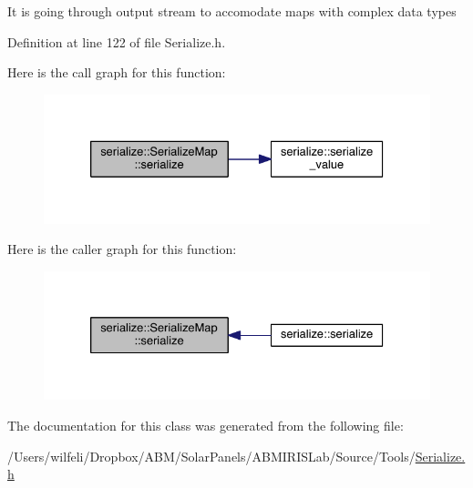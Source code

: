 It is going through output stream to accomodate maps with complex data types 

Definition at line 122 of file Serialize.\+h.



Here is the call graph for this function\+:
\nopagebreak
\begin{figure}[H]
\begin{center}
\leavevmode
\includegraphics[width=330pt]{classserialize_1_1_serialize_map_a5c22ada5923b1d8b547cec4950dd357c_cgraph}
\end{center}
\end{figure}




Here is the caller graph for this function\+:
\nopagebreak
\begin{figure}[H]
\begin{center}
\leavevmode
\includegraphics[width=330pt]{classserialize_1_1_serialize_map_a5c22ada5923b1d8b547cec4950dd357c_icgraph}
\end{center}
\end{figure}




The documentation for this class was generated from the following file\+:\begin{DoxyCompactItemize}
\item 
/\+Users/wilfeli/\+Dropbox/\+A\+B\+M/\+Solar\+Panels/\+A\+B\+M\+I\+R\+I\+S\+Lab/\+Source/\+Tools/\hyperlink{_serialize_8h}{Serialize.\+h}\end{DoxyCompactItemize}
